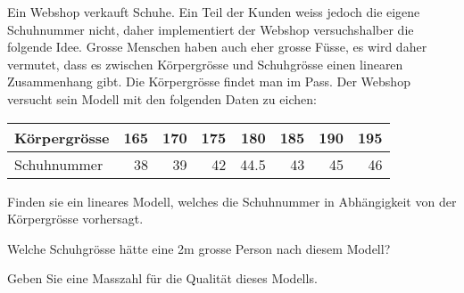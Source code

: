 Ein Webshop verkauft Schuhe.
Ein Teil der Kunden weiss jedoch die eigene Schuhnummer nicht, 
daher implementiert der Webshop versuchshalber die folgende Idee.
Grosse Menschen haben auch eher grosse Füsse, es wird daher vermutet,
dass es zwischen Körpergrösse und Schuhgrösse einen linearen
Zusammenhang gibt. 
Die Körpergrösse findet man im Pass.
Der Webshop versucht sein Modell mit den folgenden Daten zu
eichen:
\begin{center}
\begin{tabular}{lrrrrrrr}
Körpergrösse&165&170&175&180  &185&190&195\\
\hline
Schuhnummer   & 38& 39& 42& 44.5& 43& 45&46
\end{tabular}
\end{center}
\begin{teilaufgaben}
\item Finden sie ein lineares Modell, welches die Schuhnummer in
Abhängigkeit von der Körpergrösse vorhersagt.
\item Welche Schuhgrösse hätte eine 2m grosse Person nach diesem Modell?
\item Geben Sie eine Masszahl für die Qualität dieses Modells.
\end{teilaufgaben}

